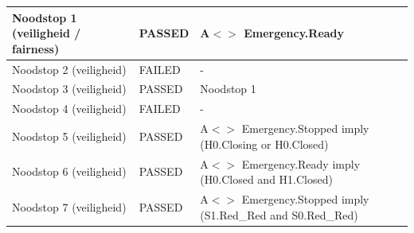 \documentclass{article}
\begin{document}
\begin{tabular}{ |p{4cm}||p{2cm}|p{7cm}|}
            Noodstop 1 (veiligheid / fairness)              &           \leavevmode\color[HTML]{32CD32} PASSED          &         A$<>$ Emergency.Ready        \\ \hline
            Noodstop 2 (veiligheid)                         &           \leavevmode\color[HTML]{FF0000} FAILED          &         -        \\ \hline
            Noodstop 3 (veiligheid)                         &           \leavevmode\color[HTML]{32CD32} PASSED          &         Noodstop 1        \\ \hline
            Noodstop 4 (veiligheid)                         &           \leavevmode\color[HTML]{FF0000} FAILED          &         -        \\ \hline
            Noodstop 5 (veiligheid)                         &           \leavevmode\color[HTML]{32CD32} PASSED          &         A$<>$ Emergency.Stopped imply (H0.Closing or H0.Closed)        \\ \hline
            Noodstop 6 (veiligheid)                         &           \leavevmode\color[HTML]{32CD32} PASSED          &         A$<>$ Emergency.Ready imply (H0.Closed and H1.Closed)        \\ \hline
            Noodstop 7 (veiligheid)                         &           \leavevmode\color[HTML]{32CD32} PASSED          &         A$<>$ Emergency.Stopped imply (S1.Red\_Red and S0.Red\_Red)\\
        \hline
    \end{tabular}





\newpage


\end{document}
